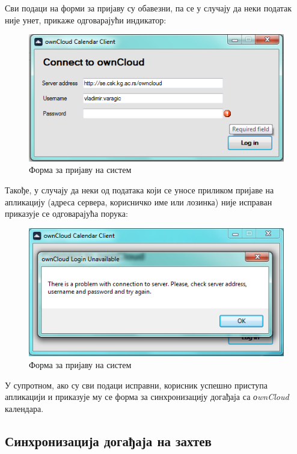 Сви подаци на форми за пријаву су обавезни, па се у случају да неки податак није унет, прикаже одговарајући индикатор:

\begin{figure}[H]
	\centering
	\includegraphics[scale=0.5]{slike/LogInFormReqiredFields.png}
	\caption{Форма за пријаву на систем}
	\label{fig:login_form_required}
\end{figure}

Такође, у случају да неки од података који се уносе приликом пријаве на апликацију (адреса сервера, корисничко име или лозинка) није исправан приказује се одговарајућа порука:

\begin{figure}[H]
	\centering
	\includegraphics[scale=0.5]{slike/logInFailed.png}
	\caption{Форма за пријаву на систем}
	\label{fig:login_form_failed}
\end{figure}

У супротном, ако су сви подаци исправни, корисник успешно приступа апликацији и приказује му се форма за синхронизацију догађаја са \textit{оwnCloud} календара.

\subsection{Синхронизација догађаја на захтев}

